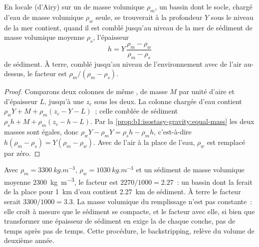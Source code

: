 \begin{proposition}\label{prop:b1:diagenesis-basins:loading}
En  locale (d'Airy) sur un  de masse volumique $\rho_m$, un bassin dont le
socle, chargé d'eau de masse volumique $\rho_w$ seule, se trouverait à la profondeur $Y$
sous le niveau de la mer contient, quand il est comblé jusqu'au niveau de la mer de sédiment de masse volumique moyenne
$\rho_s$, l'épaisseur
\[
  h = Y\,\frac{\rho_m - \rho_w}{\rho_m - \rho_s}
\]
de sédiment. À terre, comblé jusqu'au niveau de l'environnement avec de l'air au-dessus,
le facteur est $\rho_m/(\rho_m - \rho_s)$.
\end{proposition}

\begin{proof}
Comparons deux colonnes de même , de masse $M$ par unité d'aire et
d'épaisseur $L$, jusqu'à une  $z_c$ sous les deux. La colonne
chargée d'eau contient $\rho_w Y + M + \rho_m(z_c - Y - L)$~; celle comblée de sédiment
$\rho_s h + M + \rho_m(z_c - h - L)$. Par la
\cref{prop:b1:isostasy-gravity:equal-mass} les deux masses sont égales, donc
$\rho_w Y - \rho_m Y = \rho_s h - \rho_m h$, c'est-à-dire $h(\rho_m - \rho_s) =
Y(\rho_m - \rho_w)$. Avec de l'air à la place de l'eau, $\rho_w$ est remplacé par zéro.
\end{proof}

Avec $\rho_m = \qty{3300}{kg.m^{-3}}$, $\rho_w = \qty{1030}{kg.m^{-3}}$ et
un sédiment de masse volumique moyenne \qty{2300}{kg.m^{-3}}, le facteur est
$2270/1000 = \num{2.27}$~: un bassin dont la  ferait de la place pour
\qty{1}{km} d'eau contient \qty{2.27}{km} de sédiment. À terre le facteur serait
$3300/1000 = \num{3.3}$. La masse volumique du remplissage n'est pas constante~: elle croît à mesure que
le sédiment se compacte, et le facteur avec elle, si bien que transformer une épaisseur
de sédiment en  exige la  de chaque couche,
pas de temps après pas de temps. Cette procédure, le backstripping, relève du volume de
deuxième année.

